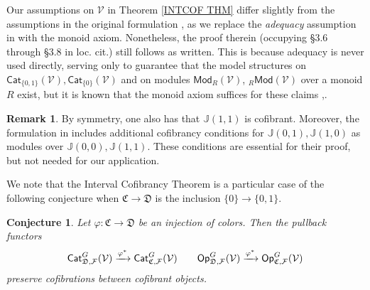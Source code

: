 \documentclass[a4paper,10pt
,draft
]{article}%
\numberwithin{equation}{section}
\numberwithin{figure}{section}
\newtheorem{conjecture}[equation]{Conjecture}%
\theoremstyle{definition} %
\newtheorem{remark}[equation]{Remark}%
\newcommand{\F}{\ensuremath{\mathcal F}}
\newcommand{\V}{\ensuremath{\mathcal V}}
\newcommand{\1}{\ensuremath{\mathbbm 1}}%
\begin{document}
Our assumptions on $\V$
in Theorem \ref{INTCOF THM} differ slightly
from the assumptions in the original formulation \cite[Thm. 1.15]{BM13},
as we replace the \emph{adequacy} assumption in
\cite[Defn. 1.1]{BM13} with the monoid axiom.
Nonetheless, the proof therein (occupying \S 3.6 through \S 3.8 in loc. cit.) still follows as written.
This is because adequacy is never used directly, 
serving only to guarantee that the 
model structures 
on $\mathsf{Cat}_{\{0,1\}}(\V),\mathsf{Cat}_{\{0\}}(\V)$
and 
on modules $\mathsf{Mod}_{R}(\V)$, $_R\mathsf{Mod}(\V)$
over a monoid $R$ exist,
but it is known that the monoid axiom suffices for these claims
\cite[Thm. 1.3]{Mur11},\cite[Thm. 4.1]{SS00}.



%



\begin{remark}
By symmetry, one also has that $\mathbb{J}(1,1)$ is cofibrant.
Moreover, the formulation in \cite[Thm. 1.15]{BM13}
includes additional cofibrancy conditions for
$\mathbb{J}(0,1),\mathbb{J}(1,0)$
as modules over $\mathbb{J}(0,0),\mathbb{J}(1,1)$.
These conditions are essential for their proof, 
but not needed for our application.
\end{remark}




We note that the Interval Cofibrancy Theorem is a particular case of the following conjecture when $\mathfrak{C} \to \mathfrak{D}$
is the inclusion $\{0\} \to \{0,1\}$.


\begin{conjecture}\label{CATOP CONJ}
Let $\varphi \colon \mathfrak{C} \to \mathfrak{D}$
be an injection of colors.
Then the pullback functors
\[
	\mathsf{Cat}_{\mathfrak{D},\F}^G(\V)
	\xrightarrow{\varphi^{\**}}
	\mathsf{Cat}_{\mathfrak{C},\F}^G(\V)
\qquad
	\mathsf{Op}_{\mathfrak{D},\F}^G(\V)
	\xrightarrow{\varphi^{\**}}
	\mathsf{Op}_{\mathfrak{C},\F}^G(\V)
\]
preserve cofibrations between cofibrant objects.
\end{conjecture}
\end{document}
